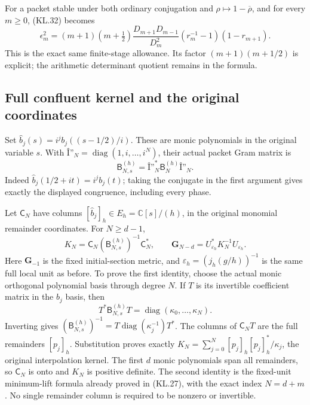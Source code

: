 \documentclass[11pt,a4paper]{article}
\begin{document}
For a packet stable under both ordinary conjugation and
\(\rho\mapsto1-\overline\rho\), and for every \(m\geq0\),
(KL.32) becomes
\[
 \boxed{\epsilon_m^2=(m+1)(m+\tfrac12)
       \frac{D_{m+1}D_{m-1}}{D_m^2}
           (r_m^{-1}-1)(1-r_{m+1}).}
                                                               \tag{TG.19}
\]
This is the exact same finite-stage allowance.  Its factor
\((m+1)(m+1/2)\) is explicit; the arithmetic determinant
quotient remains in the formula.

\subsection{Full confluent kernel and the original coordinates}

Set \(\widehat b_j(s)=i^j b_j((s-1/2)/i)\).  These are monic
polynomials in the original variable \(s\).  With
\(\mathord{\textsf{Î”}}_N=\operatorname{diag}(1,i,\ldots,i^N)\),
their actual packet Gram matrix is
\[
 \mathsf B_{N,s}^{(h)}=\mathord{\textsf{Î”}}_N^*
                  \mathsf B_N^{(h)}\mathord{\textsf{Î”}}_N.
                                                               \tag{TG.20}
\]
Indeed \(\widehat b_j(1/2+it)=i^j b_j(t)\); taking the
conjugate in the first argument gives exactly the displayed
congruence, including every phase.

Let \(\mathsf C_N\) have columns
\([\widehat b_j]_h\in E_h=\mathbb C[s]/(h)\), in the original
monomial remainder coordinates.  For \(N\geq d-1\),
\[
 \boxed{K_N=\mathsf C_N(\mathsf B_{N,s}^{(h)})^{-1}
                           \mathsf C_N^*,\qquad
  \mathbf G_{N-d}=U_{\varepsilon_h}^*K_N^{-1}
                           U_{\varepsilon_h}.}
                                                               \tag{TG.21}
\]
Here \(\mathbf G_{-1}\) is the fixed initial-section metric,
and \(\varepsilon_h=(j_h(g/h))^{-1}\) is the same full local
unit as before.  To prove the first identity, choose the actual
monic orthogonal polynomial basis through degree \(N\).  If
\(T\) is its invertible coefficient matrix in the
\(\widehat b_j\) basis, then
\[
 T^*\mathsf B_{N,s}^{(h)}T
     =\operatorname{diag}(\kappa_0,\ldots,\kappa_N).
\]
Inverting gives
\((\mathsf B_{N,s}^{(h)})^{-1}
 =T\operatorname{diag}(\kappa_j^{-1})T^*\).
The columns of \(\mathsf C_NT\) are the full remainders
\([p_j]_h\).  Substitution proves exactly
\(K_N=\sum_{j=0}^N[p_j]_h[p_j]_h^*/\kappa_j\), the original
interpolation kernel.  The first \(d\) monic polynomials span all
remainders, so \(\mathsf C_N\) is onto and \(K_N\) is positive
definite.  The second identity is the fixed-unit minimum-lift
formula already proved in (KL.27), with the exact index
\(N=d+m\).  No single remainder column is required to be nonzero
or invertible.
\end{document}
